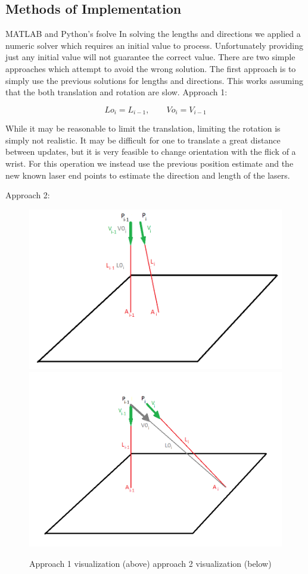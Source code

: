 \documentclass[a4paper]{article}
\begin{document}
\subsection{Methods of Implementation}
MATLAB and Python’s fsolve
In solving the lengths and directions we applied a numeric solver which requires an initial value to process. Unfortunately providing just any initial value will not guarantee the correct value. There are two simple approaches which attempt to avoid the wrong solution. The first approach is to simply use the previous solutions for lengths and directions. This works assuming that the both translation and rotation are slow. 
Approach 1:

\begin{equation}
Lo_i = L_{i-1}, \qquad Vo_i = V_{i-1}
\end{equation}


While it may be reasonable to limit the translation, limiting the rotation is simply not realistic. It may be difficult for one to translate a great distance between updates, but it is very feasible to change orientation with the flick of a wrist. For this operation we instead use the previous position estimate and the new known laser end points to estimate the direction and length of the lasers.

Approach 2:   

\begin{figure}
	\includegraphics[width=\linewidth]{resection_fig4.png}
	\includegraphics[width=\linewidth]{resection_fig5.png}
	\caption{Approach 1 visualization (above) approach 2 visualization (below)}
\end{figure}
\end{document}
